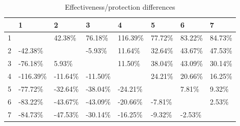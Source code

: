\begin{table}[ht]
\centering
\begin{tabular}{rlllllll}
  \hline
 & 1 & 2 & 3 & 4 & 5 & 6 & 7 \\ 
  \hline
1 &  & 42.38\% & 76.18\% & 116.39\% & 77.72\% & 83.22\% & 84.73\% \\ 
  2 & -42.38\% &  & -5.93\% & 11.64\% & 32.64\% & 43.67\% & 47.53\% \\ 
  3 & -76.18\% & 5.93\% &  & 11.50\% & 38.04\% & 43.09\% & 30.14\% \\ 
  4 & -116.39\% & -11.64\% & -11.50\% &  & 24.21\% & 20.66\% & 16.25\% \\ 
  5 & -77.72\% & -32.64\% & -38.04\% & -24.21\% &  & 7.81\% & 9.32\% \\ 
  6 & -83.22\% & -43.67\% & -43.09\% & -20.66\% & -7.81\% &  & 2.53\% \\ 
  7 & -84.73\% & -47.53\% & -30.14\% & -16.25\% & -9.32\% & -2.53\% &  \\ 
   \hline
\end{tabular}
\caption{Effectiveness/protection differences} 
\end{table}
